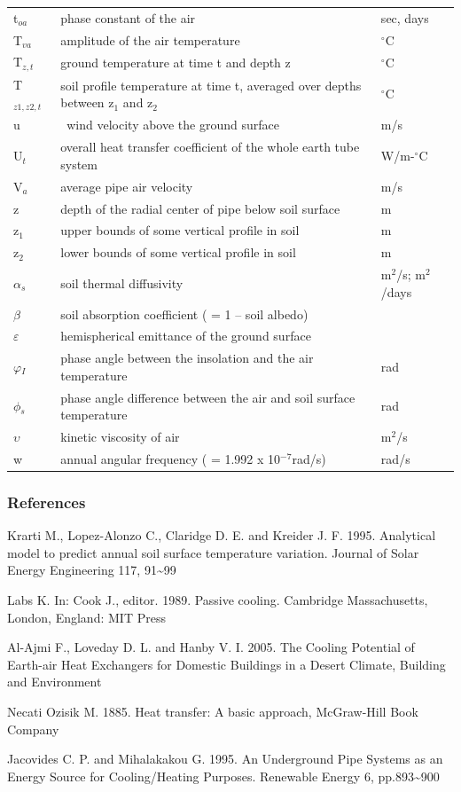 \begin{longtable}[c]{p{1.5in}p{3.0in}p{1.5in}}
t\(_{oa}\) & phase constant of the air & sec, days \tabularnewline
T\(_{va}\) & amplitude of the air temperature & \(^{\circ}\)C \tabularnewline
T\(_{z,t}\) & ground temperature at time t and depth z & \(^{\circ}\)C \tabularnewline
T\(_{z1,z2,t}\) & soil profile temperature at time t, averaged over depths between z\(_{1}\) and z\(_{2}\) & \(^{\circ}\)C \tabularnewline
u & ~wind velocity above the ground surface & m/s \tabularnewline
U\(_{t}\) & overall heat transfer coefficient of the whole earth tube system & W/m-\(^{\circ}\)C \tabularnewline
V\(_{a}\) & average pipe air velocity & m/s \tabularnewline
z & depth of the radial center of pipe below soil surface & m \tabularnewline
z\(_{1}\) & upper bounds of some vertical profile in soil & m \tabularnewline
z\(_{2}\) & lower bounds of some vertical profile in soil & m \tabularnewline
$\alpha$\(_{s}\) & soil thermal diffusivity & m\(^{2}\)/s; m\(^{2}\)/days \tabularnewline
$\beta$ & soil absorption coefficient ( = 1 – soil albedo) & ~ \tabularnewline
$\varepsilon$ & hemispherical emittance of the ground surface & ~ \tabularnewline
$\varphi$\(_{I}\) & phase angle between the insolation and the air temperature & rad \tabularnewline
$\phi$\(_{s}\) & phase angle difference between the air and soil surface temperature & rad \tabularnewline
$\upsilon$ & kinetic viscosity of air & m\(^{2}\)/s \tabularnewline
w & annual angular frequency ( = 1.992 x 10\(^{-7}\)rad/s) & rad/s \tabularnewline
\bottomrule
\end{longtable}

\subsubsection{References}\label{references-6-001}

Krarti M., Lopez-Alonzo C., Claridge D. E. and Kreider J. F. 1995. Analytical model to predict annual soil surface temperature variation. Journal of Solar Energy Engineering 117, 91\textasciitilde{}99

Labs K. In: Cook J., editor. 1989. Passive cooling. Cambridge Massachusetts, London, England: MIT Press

Al-Ajmi F., Loveday D. L. and Hanby V. I. 2005. The Cooling Potential of Earth-air Heat Exchangers for Domestic Buildings in a Desert Climate, Building and Environment

Necati Ozisik M. 1885. Heat transfer: A basic approach, McGraw-Hill Book Company

Jacovides C. P. and Mihalakakou G. 1995. An Underground Pipe Systems as an Energy Source for Cooling/Heating Purposes. Renewable Energy 6, pp.893\textasciitilde{}900

